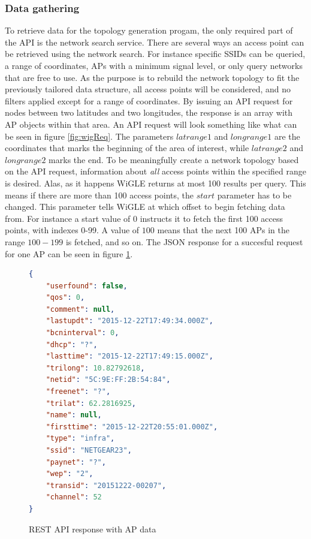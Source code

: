	\subsubsection{Data gathering}
	To retrieve data for the topology generation progam, the only required part of the API is the network search service. There are several ways an access point can be retrieved using
	the network search. For instance specific SSIDs can be queried, a range of coordinates, APs with a minimum signal level, or only query networks that are free to use. As 
	the purpose is to rebuild the network topology to fit the previously tailored data structure, all access points will be considered, and no filters applied except for a range of coordinates.
	By issuing an API request for nodes between two latitudes and two longitudes, the response is an array with AP objects within that area.  
	An API request will look something like what can be seen in figure \ref{fig:wigReq}. 
	The parameters $latrange1$ and $longrange1$ are the coordinates that marks the beginning of the area of interest, while $latrange2$ and $longrange2$ marks the end. 
	To be meaningfully create a network topology based on the API request, information about \textit{all} access points within the specified range is desired. Alas, as it happens
	WiGLE returns at most 100 results per query. This means if there are more than 100 access points, the $start$
	parameter has to be changed. This parameter tells WiGLE at which offset to begin fetching data from. For instance a start value of $0$ instructs it to fetch the first 100 access points, with indexes 0-99. A value of $100$ means that the next 100 APs in the range $100-199$ is fetched, and so on. The JSON response for a succesful request for one AP can be seen in figure \ref{fig:wigle}. 

	\begin{figure}

	\begin{lstlisting}[language=json]
{
	"userfound": false,
	"qos": 0,
	"comment": null,
	"lastupdt": "2015-12-22T17:49:34.000Z",
	"bcninterval": 0,
	"dhcp": "?",
	"lasttime": "2015-12-22T17:49:15.000Z",
	"trilong": 10.82792618,
	"netid": "5C:9E:FF:2B:54:84",
	"freenet": "?",
	"trilat": 62.2816925,
	"name": null,
	"firsttime": "2015-12-22T20:55:01.000Z",
	"type": "infra",
	"ssid": "NETGEAR23",
	"paynet": "?",
	"wep": "2",
	"transid": "20151222-00207",
	"channel": 52
}

\end{lstlisting}
\caption{REST API response with AP data}
\label{fig:wigle}
\end{figure}

